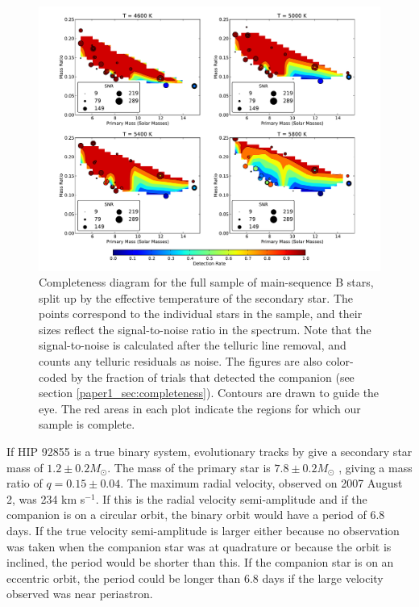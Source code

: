 \begin{figure}[t]
  \centering
  \includegraphics[width=5.5in]{Figures/paper1_fig6.pdf}
  \caption{Completeness diagram for the full sample of main-sequence B
  stars, split up by the effective temperature of the secondary
  star. The points correspond to the individual stars in the sample,
  and their sizes reflect the signal-to-noise ratio in the
  spectrum. Note that the signal-to-noise is calculated after the
  telluric line removal, and counts any telluric residuals as
  noise. The figures are also color-coded by the fraction of trials
  that detected the companion (see section
  \ref{paper1_sec:completeness}). Contours are drawn to guide the eye. The red 
  areas in each plot indicate the regions for which our sample is complete.}
  \label{paper1_fig:completeness}
\end{figure}

If HIP 92855 is a true binary system, evolutionary tracks by
\cite{Landin2008} give a secondary star mass of $1.2 \pm 0.2 M_{\odot}$. The mass of the
primary star is $7.8 \pm 0.2 M_{\odot}$ \citep{Tetzlaff2010}, giving a mass
ratio of $q = 0.15 \pm 0.04$. The maximum radial velocity, observed on 2007 August 2, was 234 km s$^{-1}$. If this is the radial velocity semi-amplitude and if the companion is on a circular orbit, the binary orbit would have a period of 6.8 days. If the true velocity semi-amplitude is larger either because no observation was taken when the companion star was at quadrature or because the orbit is inclined, the period would be shorter than this. If the companion star is on an eccentric orbit, the period could be longer than 6.8 days if the large velocity observed was near periastron.




